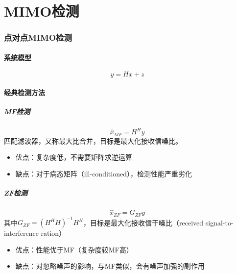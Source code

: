 \part{MIMO检测}
\section{点对点MIMO检测}
\subsection{系统模型}
$$
y=Hx+z
$$

\subsection{经典检测方法}
\subsubsection{MF检测}
\begin{equation}
\hat{x}_{MF}=H^Hy
\end{equation}
匹配滤波器，又称最大比合并，目标是最大化接收信噪比。
\begin{itemize}
    \item 优点：复杂度低，不需要矩阵求逆运算
    \item 缺点：对于病态矩阵（ill-conditioned），检测性能严重劣化
\end{itemize}
    
\subsubsection{ZF检测}
\begin{equation}
    \hat{x}_{ZF}=G_{ZF}y
\end{equation}
其中$G_{ZF}=(H^HH)^{-1}H^H$，目标是最大化接收信干噪比（received signal-to-interference ration）
\begin{itemize}
    \item 优点：性能优于MF（复杂度较MF高）
    \item 缺点：对忽略噪声的影响，与MF类似，会有噪声加强的副作用
\end{itemize}
